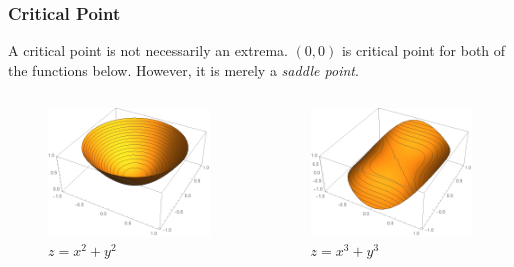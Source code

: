 \documentclass[11pt, t]{beamer}
\renewcommand{\emph}[1]{{\color{Turquoise3}\textsl{#1}}}
\begin{document}
\begin{frame}
    \frametitle{Critical Point}
    A critical point is not necessarily an extrema. $(0,0)$ is critical point for both of the functions below. However, it is merely a \emph{saddle point}.
    \begin{columns}
        \begin{column}{0.5\textwidth}
            \begin{figure}[H]
                \centering
                \includegraphics[width=\textwidth]{Figures/2020-07-29-15-39-20.png}
                \caption{$z=x^2+y^2$}
            \end{figure}
        \end{column}
        \begin{column}{0.5\textwidth}
            \begin{figure}[H]
                \centering
                \includegraphics[width=\textwidth]{Figures/2020-07-29-15-40-05.png}
                \caption{$z=x^3+y^3$}
                \label{fig:}
            \end{figure}

        \end{column}
    \end{columns}
\end{frame}
\end{document}
